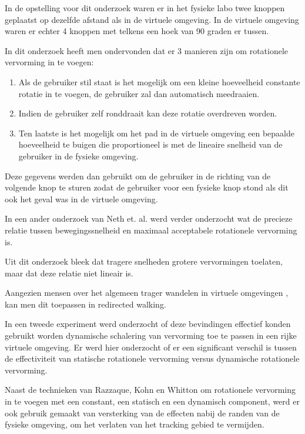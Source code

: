 \documentclass[a4paper,12pt]{article}
\begin{document}
In de opstelling voor dit onderzoek waren er in het fysieke labo twee knoppen
geplaatst op dezelfde afstand als in de virtuele omgeving. In de virtuele
omgeving waren er echter 4 knoppen met telkens een hoek van 90 graden er tussen.

In dit onderzoek heeft men ondervonden dat er 3 manieren zijn om rotationele
vervorming in te voegen:

\begin{enumerate}
    \item Als de gebruiker stil staat is het mogelijk om een kleine hoeveelheid
        constante rotatie in te voegen, de gebruiker zal dan automatisch
        meedraaien.
    \item Indien de gebruiker zelf ronddraait kan deze rotatie overdreven worden.
    \item Ten laatste is het mogelijk om het pad in de virtuele omgeving een
        bepaalde hoeveelheid te buigen die proportioneel is met de lineaire
        snelheid van de gebruiker in de fysieke omgeving.
\end{enumerate}

Deze gegevens werden dan gebruikt om de gebruiker in de richting van de volgende
knop te sturen zodat de gebruiker voor een fysieke knop stond als dit ook het
geval was in de virtuele omgeving.

In een ander onderzoek van Neth et. al.\cite{neth12} werd verder onderzocht wat
de precieze relatie tussen bewegingssnelheid en maximaal acceptabele rotationele
vervorming is.

Uit dit onderzoek bleek dat tragere snelheden grotere vervormingen toelaten, maar
dat deze relatie niet lineair is.

Aangezien mensen over het algemeen trager wandelen in virtuele omgevingen
\cite{mohler07}, kan men dit toepassen in redirected walking.

In een tweede experiment\cite{neth12} werd onderzocht of deze bevindingen
effectief konden gebruikt worden dynamische schalering van vervorming toe te
passen in een rijke virtuele omgeving. Er werd hier onderzocht of er een
significant verschil is tussen de effectiviteit van statische rotationele
vervorming versus dynamische rotationele vervorming.

Naast de technieken van Razzaque, Kohn en Whitton\cite{kohn01} om rotationele
vervorming in te voegen met een constant, een statisch en een dynamisch component,
werd er ook gebruik gemaakt van versterking van de effecten nabij de randen van
de fysieke omgeving, om het verlaten van het tracking gebied te vermijden.
\end{document}
